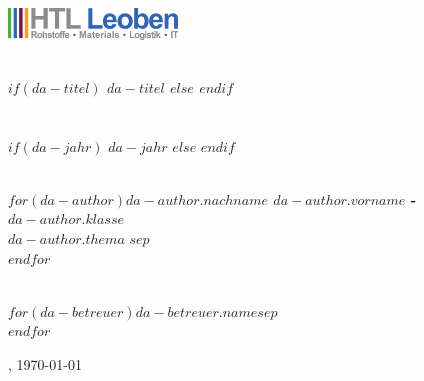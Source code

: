 \documentclass[
    headings=optiontotocandhead,%
    twoside,
    numbers=noenddot,%
    12pt, %
    titlepage, %
    parskip=full, %
    listof=leveldown, 
    numbers=noenddot, %
    a4paper,DIV=14,
    BCOR=15mm,
]{scrbook}
\begin{document}
\frontmatter %
\title{}
\begin{titlepage}

\begin{center}

\includegraphics[width=45mm]{style/HTLLE-Logo.png}

\vspace{2cm}
\textbf{\LARGE{}}{\large{}}\\
{\large{}\vspace{15mm}
 \textbf{\large{}
$if(da-titel)$
$da-titel$
$else$
$endif$
}\\

 \vspace{15mm}
  \\
  \\
 \vspace{1cm}
$if(da-jahr)$
$da-jahr$
$else$
$endif$
\\
 \vspace{1cm}
 \\
 \vspace{0.5cm}
}

$for(da-author)$\textbf{$da-author.nachname$ $da-author.vorname$ - $da-author.klasse$} \\ 
$da-author.thema$
\vspace{5mm}
$sep$\\ $endfor$

\par\end{center}{\large \par}

\begin{center}
 \normalsize {} \\
 \vspace{0.5cm}
$for(da-betreuer)$$da-betreuer.name$$sep$\\ $endfor$

\par\end{center}

\begin{center}
\vspace{5mm}
, \today 
\par\end{center}
\end{titlepage}
\end{document}

